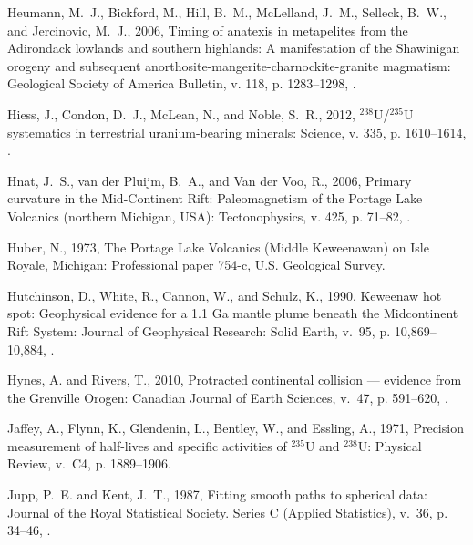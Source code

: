\documentclass[11pt,letterpaper]{article}
\begin{document}
\begin{thebibliography}{153}
Heumann, M.~J., Bickford, M., Hill, B.~M., McLelland, J.~M., Selleck, B.~W.,
  and Jercinovic, M.~J., 2006, {Timing of anatexis in metapelites from the
  Adirondack lowlands and southern highlands: A manifestation of the Shawinigan
  orogeny and subsequent anorthosite-mangerite-charnockite-granite magmatism}:
  Geological Society of America Bulletin, v. 118, p. 1283--1298,
  .

Hiess, J., Condon, D.~J., McLean, N., and Noble, S.~R., 2012,
  $^{238}${U}/$^{235}${U} systematics in terrestrial uranium-bearing minerals:
  Science, v. 335, p. 1610--1614, .

{Hnat}, J.~S., {van der Pluijm}, B.~A., and {Van der Voo}, R., 2006, {Primary
  curvature in the Mid-Continent Rift: Paleomagnetism of the Portage Lake
  Volcanics (northern Michigan, USA)}: Tectonophysics, v. 425, p. 71--82,
  .

Huber, N., 1973, {The Portage Lake Volcanics (Middle Keweenawan) on Isle
  Royale, Michigan}: Professional paper 754-c, U.S. Geological Survey.

Hutchinson, D., White, R., Cannon, W., and Schulz, K., 1990, {Keweenaw hot
  spot: Geophysical evidence for a 1.1 Ga mantle plume beneath the Midcontinent
  Rift System}: Journal of Geophysical Research: Solid Earth, v.~95, p.
  10,869--10,884, .

Hynes, A. and Rivers, T., 2010, Protracted continental collision --- evidence
  from the {Grenville Orogen}: Canadian Journal of Earth Sciences, v.~47, p.
  591--620, .

Jaffey, A., Flynn, K., Glendenin, L., Bentley, W., and Essling, A., 1971,
  Precision measurement of half-lives and specific activities of $^{235}${U}
  and $^{238}${U}: Physical Review, v.~C4, p. 1889--1906.

Jupp, P.~E. and Kent, J.~T., 1987, Fitting smooth paths to spherical data:
  Journal of the Royal Statistical Society. Series C (Applied Statistics),
  v.~36, p. 34--46, .


\end{thebibliography}
\end{document}
